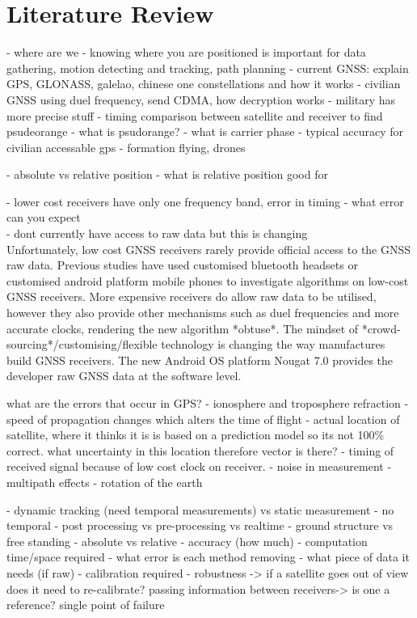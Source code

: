 \documentclass[11pt,a4paper]{article}
\begin{document}
\section{Literature Review}

- where are we
- knowing where you are positioned is important for data gathering, motion detecting and tracking, path planning
- current GNSS: explain GPS, GLONASS, galelao, chinese one constellations and how it works
- civilian GNSS using duel frequency, send CDMA, how decryption works
- military has more precise stuff
- timing comparison between satellite and receiver to find psudeorange
- what is psudorange?
- what is carrier phase
- typical accuracy for civilian accessable gps
- formation flying, drones

- absolute vs relative position
- what is relative position good for

- lower cost receivers have only one frequency band, error in timing
- what error can you expect\\

- dont currently have access to raw data but this is changing\\
Unfortunately, low cost GNSS receivers rarely provide official access to the GNSS raw data. Previous studies have used customised bluetooth headsets or customised android platform mobile phones to investigate algorithms on low-cost GNSS receivers. More expensive receivers do allow raw data to be utilised, however they also provide other mechanisms such as duel frequencies and more accurate clocks, rendering the new algorithm *obtuse*. The mindset of *crowd-sourcing*/customising/flexible technology is changing the way manufactures build GNSS receivers. The new Android OS platform Nougat 7.0 provides the developer raw GNSS data at the software level.  


what are the errors that occur in GPS?
- ionosphere and troposphere refraction - speed of propagation changes which alters the time of flight
- actual location of satellite, where it thinks it is is based on a prediction model so its not 100\% correct. what uncertainty in this location therefore vector is there?
- timing of received signal because of low cost clock on receiver. 
- noise in measurement
- multipath effects
- rotation of the earth


- dynamic tracking (need temporal measurements) vs static measurement - no temporal
- post processing vs pre-processing vs realtime
- ground structure vs free standing
- absolute vs relative
- accuracy (how much)
- computation time/space required
- what error is each method removing
- what piece of data it needs (if raw)
- calibration required
- robustness -> if a satellite goes out of view does it need to re-calibrate? passing information between receivers-> is one a reference? single point of failure
\end{document}
